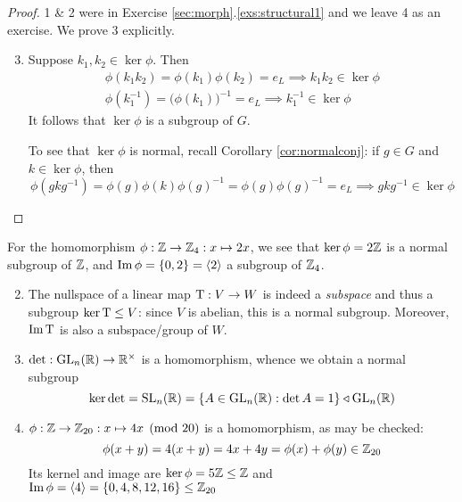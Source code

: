 \begin{proof}
1 \& 2 were in Exercise \ref*{sec:morph}.\ref{exs:structural1} and we leave 4 as an exercise. We prove 3 explicitly.
\begin{enumerate}\setcounter{enumi}{2}
  \item Suppose $k_1,k_2\in\ker\phi$. Then
  \begin{gather*}
  \phi(k_1k_2)=\phi(k_1)\phi(k_2)=e_L\implies k_1k_2\in\ker\phi\\
  \phi(k_1^{-1})=\bigl(\phi(k_1)\bigr)^{-1}=e_L\implies k_1^{-1}\in\ker\phi
  \end{gather*}
  It follows that $\ker\phi$ is a subgroup of $G$.\par
  To see that $\ker\phi$ is normal, recall Corollary \ref{cor:normalconj}: if $g\in G$ and $k\in\ker\phi$, then
  \[\phi(gk g^{-1})=\phi(g)\phi(k)\phi(g)^{-1}=\phi(g)\phi(g)^{-1}=e_L\implies gk g^{-1}\in\ker\phi\tag*{\qedhere}\]
\end{enumerate}
\end{proof}

\goodbreak

\begin{examples}{}{}
\exstart For the homomorphism $\phi:\mathbb{Z}\to\mathbb{Z}_4:x\mapsto 2x$, we see that $\ker\phi=2\mathbb{Z}$ is a normal subgroup of $\mathbb{Z}$, and $\operatorname{Im}\phi=\{0,2\}=\left\langle 2\right\rangle$ a subgroup of $\mathbb{Z}_4$. 
\begin{enumerate}\setcounter{enumi}{1}
  \item The nullspace of a linear map $\mathrm{T}:V\to W$ is indeed a \emph{subspace} and thus a subgroup $\ker\mathrm{T}\le V$: since $V$ is abelian, this is a normal subgroup. Moreover, $\operatorname{Im}\mathrm{T}$ is also a subspace/group of $W$.
  
	\item $\det:\mathrm{GL}_n(\mathbb{R})\to\mathbb{R}^\times$ is a homomorphism, whence we obtain a normal subgroup
	\[\ker\det=\mathrm{SL}_n(\mathbb{R})=\{A\in\mathrm{GL}_n(\mathbb{R}):\det A=1\}\triangleleft\mathrm{GL}_n(\mathbb{R})\]
	
	\item $\phi:\mathbb{Z}\to\mathbb{Z}_{20}:x\mapsto 4x\pmod{20}$ is a homomorphism, as may be checked:
	\[\phi(x+y)=4(x+y)=4x+4y=\phi(x)+\phi(y)\in\mathbb{Z}_{20}\]
	Its kernel and image are $\ker\phi=5\mathbb{Z}\le\mathbb{Z}$ and $\operatorname{Im}\phi=\left\langle 4\right\rangle=\{0,4,8,12,16\}\le\mathbb{Z}_{20}$
\end{enumerate}
\end{examples}

